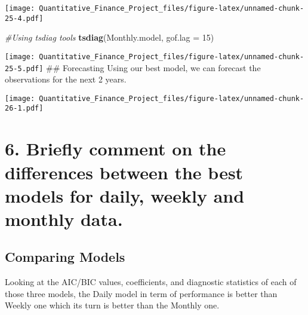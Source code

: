 \documentclass[
]{article}
\newenvironment{Shaded}{\begin{snugshade}}{\end{snugshade}}
\newcommand{\AttributeTok}[1]{\textcolor[rgb]{0.13,0.29,0.53}{#1}}
\newcommand{\CommentTok}[1]{\textcolor[rgb]{0.56,0.35,0.01}{\textit{#1}}}
\newcommand{\DecValTok}[1]{\textcolor[rgb]{0.00,0.00,0.81}{#1}}
\newcommand{\FunctionTok}[1]{\textcolor[rgb]{0.13,0.29,0.53}{\textbf{#1}}}
\newcommand{\NormalTok}[1]{#1}
\newcommand{\OtherTok}[1]{\textcolor[rgb]{0.56,0.35,0.01}{#1}}
\newcommand{\SpecialCharTok}[1]{\textcolor[rgb]{0.81,0.36,0.00}{\textbf{#1}}}
\newcommand{\StringTok}[1]{\textcolor[rgb]{0.31,0.60,0.02}{#1}}
\begin{document}
\texttt{[image: Quantitative\_Finance\_Project\_files/figure-latex/unnamed-chunk-25-4.pdf]}

\begin{Shaded}
\begin{Highlighting}[]
\CommentTok{\#Using tsdiag tools}
\FunctionTok{tsdiag}\NormalTok{(Monthly.model, }\AttributeTok{gof.lag =} \DecValTok{15}\NormalTok{)}
\end{Highlighting}
\end{Shaded}

\texttt{[image: Quantitative\_Finance\_Project\_files/figure-latex/unnamed-chunk-25-5.pdf]}
\#\# Forecasting Using our best model, we can forecast the observations
for the next 2 years.

\begin{Shaded}
\end{Shaded}

\texttt{[image: Quantitative\_Finance\_Project\_files/figure-latex/unnamed-chunk-26-1.pdf]}

\hypertarget{briefly-comment-on-the-differences-between-the-best-models-for-daily-weekly-and-monthly-data.}{%
\section{6. Briefly comment on the differences between the best models
for daily, weekly and monthly
data.}\label{briefly-comment-on-the-differences-between-the-best-models-for-daily-weekly-and-monthly-data.}}

\hypertarget{comparing-models}{%
\subsection{Comparing Models}\label{comparing-models}}

Looking at the AIC/BIC values, coefficients, and diagnostic statistics
of each of those three models, the Daily model in term of performance is
better than Weekly one which its turn is better than the Monthly one.
\end{document}
